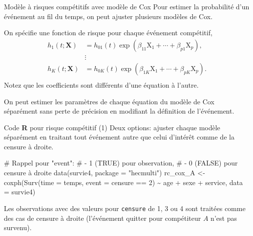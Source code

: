 \documentclass[
  ignorenonframetext,
]{beamer}
\newenvironment{Shaded}{\begin{snugshade}}{\end{snugshade}}
\newcommand{\AttributeTok}[1]{\textcolor[rgb]{0.40,0.45,0.13}{#1}}
\newcommand{\CommentTok}[1]{\textcolor[rgb]{0.37,0.37,0.37}{#1}}
\newcommand{\DecValTok}[1]{\textcolor[rgb]{0.68,0.00,0.00}{#1}}
\newcommand{\FunctionTok}[1]{\textcolor[rgb]{0.28,0.35,0.67}{#1}}
\newcommand{\NormalTok}[1]{\textcolor[rgb]{0.00,0.23,0.31}{#1}}
\newcommand{\OtherTok}[1]{\textcolor[rgb]{0.00,0.23,0.31}{#1}}
\newcommand{\SpecialCharTok}[1]{\textcolor[rgb]{0.37,0.37,0.37}{#1}}
\newcommand{\StringTok}[1]{\textcolor[rgb]{0.13,0.47,0.30}{#1}}
\begin{document}
\begin{frame}{Modèle à risques compétitifs avec modèle de Cox}
\protect{}\label{moduxe8le-uxe0-risques-compuxe9titifs-avec-moduxe8le-de-cox}
Pour estimer la probabilité d'un événement au fil du temps, on peut
ajuster plusieurs modèles de Cox.

On spécifie une fonction de risque pour chaque événement compétitif,
\begin{align*}
h_1(t; \mathbf{X})&= h_{01}(t) \exp(\beta_{11}\mathrm{X}_1 + \cdots + \beta_{p1} \mathrm{X}_p),\\
&\vdots\\
h_K(t; \mathbf{X})&= h_{0K}(t) \exp(\beta_{1K}\mathrm{X}_1 + \cdots + \beta_{pK} \mathrm{X}_p).\\
\end{align*} Notez que les coefficients sont différents d'une équation à
l'autre.

On peut estimer les paramètres de chaque équation du modèle de Cox
séparément sans perte de précision en modifiant la définition de
l'événement.
\end{frame}

\begin{frame}[fragile]{Code \textbf{R} pour risque compétitif (1)}
\protect{}\label{code-r-pour-risque-compuxe9titif-1}
Deux options: ajuster chaque modèle séparément en traitant tout
événement autre que celui d'intérêt comme de la censure à droite.

\begin{Shaded}
\begin{Highlighting}[numbers=left,,]
\CommentTok{\# Rappel pour "event":}
\CommentTok{\#  {-} 1 (TRUE) pour observation, }
\CommentTok{\#  {-} 0 (FALSE) pour censure à droite}
\FunctionTok{data}\NormalTok{(survie4, }\AttributeTok{package =} \StringTok{"hecmulti"}\NormalTok{)}
\NormalTok{rc\_cox\_A }\OtherTok{\textless{}{-}} \FunctionTok{coxph}\NormalTok{(}\FunctionTok{Surv}\NormalTok{(}\AttributeTok{time =}\NormalTok{ temps, }
                       \AttributeTok{event =}\NormalTok{ censure }\SpecialCharTok{==} \DecValTok{2}\NormalTok{) }\SpecialCharTok{\textasciitilde{}} 
\NormalTok{                     age }\SpecialCharTok{+}\NormalTok{ sexe }\SpecialCharTok{+}\NormalTok{ service, }
              \AttributeTok{data =}\NormalTok{ survie4)}
\end{Highlighting}
\end{Shaded}

\footnotesize

Les observations avec des valeurs pour \texttt{censure} de 1, 3 ou 4
sont traitées comme des cas de censure à droite (l'événement quitter
pour compétiteur \(A\) n'est pas survenu).

\normalsize
\end{frame}
\end{document}
